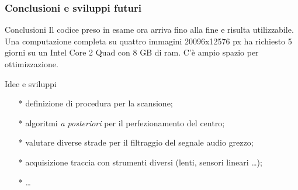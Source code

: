 \begin{frame}
\frametitle{Conclusioni e sviluppi futuri}
\begin{block}{Conclusioni}
Il codice preso in esame ora arriva fino alla fine e risulta utilizzabile.
Una computazione completa su quattro immagini 20096x12576 px ha richiesto 5 giorni su 
un Intel Core 2 Quad con 8 GB di ram. C'\`e ampio spazio per ottimizzazione.
\end{block}

\begin{block}{Idee e sviluppi}
\begin{itemize}
\item[*] definizione di procedura per la scansione;
\item[*] algoritmi \emph{a posteriori} per il perfezionamento del centro;
\item[*] valutare diverse strade per il filtraggio del segnale audio grezzo;
\item[*] acquisizione traccia con strumenti diversi (lenti, sensori lineari \dots);
\item[*] \dots
\end{itemize}

\end{block}
\end{frame}
